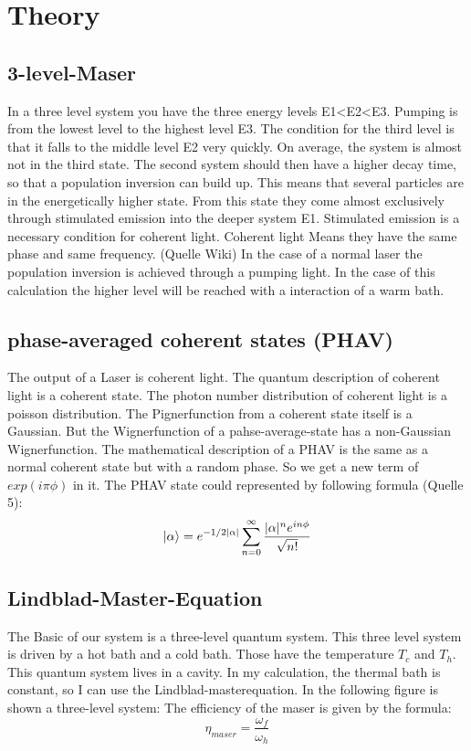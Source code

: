 \documentclass[12pt,a4paper]{article}
\DeclarePairedDelimiter\ket{\lvert}{\rangle}
\begin{document}
\section{Theory}
\subsection{3-level-Maser}
In a three level system you have the three energy levels E1<E2<E3. Pumping is from the lowest level to the highest level E3. The condition for the third level is that it falls to the middle level E2 very quickly. On average, the system is almost not in the third state. The second system should then have a higher decay time, so that a population inversion can build up. This means that several particles are in the energetically higher state. From this state they come almost exclusively through stimulated emission into the deeper system E1. Stimulated emission is a necessary condition for coherent light. Coherent light Means they have the same phase and same frequency. (Quelle Wiki)
In the case of a normal laser the population inversion is achieved through a pumping light.
In the case of this calculation the higher level will be reached with a interaction of a warm bath.%
\subsection{phase-averaged coherent states (PHAV)}
The output of a Laser is coherent light.
The quantum description of coherent light is a coherent state. The photon number distribution of coherent light is a poisson distribution. 
The Pignerfunction from a coherent state itself is a Gaussian. But the Wignerfunction of a pahse-average-state has a non-Gaussian Wignerfunction. 
The mathematical description of a  PHAV is the same as a normal coherent state but with a random phase. So we get a new term of $exp(i\pi\phi)$ in it. 
The PHAV state could represented by following formula (Quelle 5):
\begin{equation}
\ket{\alpha}=e^{-1/2|\alpha|}\sum_{n=0}^{\infty}\frac{|\alpha|^n e^{in\phi}}{\sqrt{n!}}
\end{equation}
\subsection{Lindblad-Master-Equation}
The Basic of our system is a three-level quantum system. This three level system is driven by a hot bath and a cold bath. Those have the temperature $T_c$ and $T_h$. This quantum system lives in a cavity. 
In my calculation, the thermal bath is constant, so I can use the Lindblad-masterequation. 
In the following figure is shown a three-level system:
The efficiency of the maser is given by the formula:
\begin{equation}
\eta_{maser}=\frac{\omega_f}{\omega_h}
\end{equation}
\end{document}
